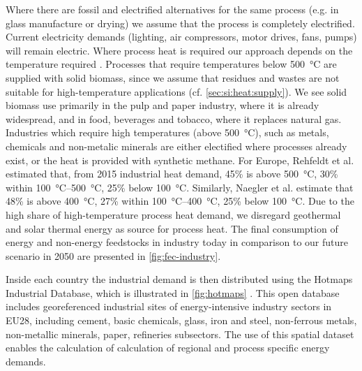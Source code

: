 Where there are fossil and electrified alternatives for the same process (e.g.
in glass manufacture or drying) we assume that the process is completely
electrified. Current electricity demands (lighting, air compressors, motor
drives, fans, pumps) will remain electric. Where process heat is required our
approach depends on the temperature required
.
Processes that require temperatures below \SI{500}{\celsius} are supplied with
solid biomass, since we assume that residues and wastes are not suitable for
high-temperature applications (cf. \cref{sec:si:heat:supply}). We see solid
biomass use primarily in the pulp and paper industry, where it is already
widespread, and in food, beverages and tobacco, where it replaces natural gas.
Industries which require high temperatures (above \SI{500}{\celsius}), such as
metals, chemicals and non-metalic minerals are either electified where processes
already exist, or the heat is provided with synthetic methane. For Europe,
Rehfeldt et al.  estimated that, from 2015
industrial heat demand, 45\% is above \SI{500}{\celsius}, 30\% within
\SIrange{100}{500}{\celsius}, 25\% below \SI{100}{\celsius}. Similarly, Naegler
et al.  estimate that 48\% is above
\SI{400}{\celsius}, 27\% within \SIrange{100}{400}{\celsius}, 25\% below
\SI{100}{\celsius}. Due to the high share of high-temperature process heat
demand, we disregard geothermal and solar thermal energy as source for process
heat. The final consumption of energy and non-energy feedstocks in industry
today in comparison to our future scenario in 2050 are presented in
\cref{fig:fec-industry}.

Inside each country the industrial demand is then distributed using the Hotmaps
Industrial Database, which is illustrated in \cref{fig:hotmaps} \citeS{}. This
open database includes georeferenced industrial sites of energy-intensive
industry sectors in EU28, including cement, basic chemicals, glass, iron and
steel, non-ferrous metals, non-metallic minerals, paper, refineries subsectors.
The use of this spatial dataset enables the calculation of calculation of
regional and process specific energy demands.


